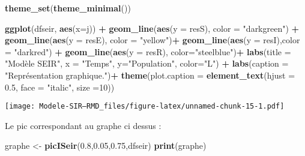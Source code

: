 \documentclass[
]{article}
\newenvironment{Shaded}{\begin{snugshade}}{\end{snugshade}}
\newcommand{\DataTypeTok}[1]{\textcolor[rgb]{0.13,0.29,0.53}{#1}}
\newcommand{\DecValTok}[1]{\textcolor[rgb]{0.00,0.00,0.81}{#1}}
\newcommand{\FloatTok}[1]{\textcolor[rgb]{0.00,0.00,0.81}{#1}}
\newcommand{\KeywordTok}[1]{\textcolor[rgb]{0.13,0.29,0.53}{\textbf{#1}}}
\newcommand{\NormalTok}[1]{#1}
\newcommand{\OperatorTok}[1]{\textcolor[rgb]{0.81,0.36,0.00}{\textbf{#1}}}
\newcommand{\StringTok}[1]{\textcolor[rgb]{0.31,0.60,0.02}{#1}}
\begin{document}
\begin{Shaded}
\begin{Highlighting}[]
\KeywordTok{theme_set}\NormalTok{(}\KeywordTok{theme_minimal}\NormalTok{())}

\KeywordTok{ggplot}\NormalTok{(dfseir, }\KeywordTok{aes}\NormalTok{(}\DataTypeTok{x=}\NormalTok{j)) }\OperatorTok{+}\StringTok{                                                    }\KeywordTok{geom_line}\NormalTok{(}\KeywordTok{aes}\NormalTok{(}\DataTypeTok{y =}\NormalTok{ resS), }\DataTypeTok{color =} \StringTok{"darkgreen"}\NormalTok{) }\OperatorTok{+}\StringTok{                         }\KeywordTok{geom_line}\NormalTok{(}\KeywordTok{aes}\NormalTok{(}\DataTypeTok{y =}\NormalTok{ resE), }\DataTypeTok{color =} \StringTok{"yellow"}\NormalTok{)}\OperatorTok{+}\StringTok{                             }\KeywordTok{geom_line}\NormalTok{(}\KeywordTok{aes}\NormalTok{(}\DataTypeTok{y =}\NormalTok{ resI),}\DataTypeTok{color =} \StringTok{"darkred"}\NormalTok{) }\OperatorTok{+}\StringTok{                           }\KeywordTok{geom_line}\NormalTok{(}\KeywordTok{aes}\NormalTok{(}\DataTypeTok{y =}\NormalTok{ resR), }\DataTypeTok{color=}\StringTok{"steelblue"}\NormalTok{)}\OperatorTok{+}\StringTok{                              }\KeywordTok{labs}\NormalTok{(}\DataTypeTok{title =} \StringTok{"Modèle SEIR"}\NormalTok{, }\DataTypeTok{x =} \StringTok{"Temps"}\NormalTok{, }\DataTypeTok{y=}\StringTok{"Population"}\NormalTok{, }\DataTypeTok{color=}\StringTok{"L"}\NormalTok{) }\OperatorTok{+}\StringTok{    }\KeywordTok{labs}\NormalTok{(}\DataTypeTok{caption =} \StringTok{"Représentation graphique."}\NormalTok{)}\OperatorTok{+}\StringTok{                            }\KeywordTok{theme}\NormalTok{(}\DataTypeTok{plot.caption =} \KeywordTok{element_text}\NormalTok{(}\DataTypeTok{hjust =} \FloatTok{0.5}\NormalTok{, }\DataTypeTok{face =} \StringTok{"italic"}\NormalTok{, }\DataTypeTok{size =}\DecValTok{10}\NormalTok{))}
\end{Highlighting}
\end{Shaded}

\texttt{[image: Modele-SIR---RMD\_files/figure-latex/unnamed-chunk-15-1.pdf]}

Le pic correspondant au graphe ci dessus :

\begin{Shaded}
\begin{Highlighting}[]
\NormalTok{graphe <-}\StringTok{ }\KeywordTok{picISeir}\NormalTok{(}\FloatTok{0.8}\NormalTok{,}\FloatTok{0.05}\NormalTok{,}\FloatTok{0.75}\NormalTok{,dfseir)}
\KeywordTok{print}\NormalTok{(graphe)}
\end{Highlighting}
\end{Shaded}
\end{document}
